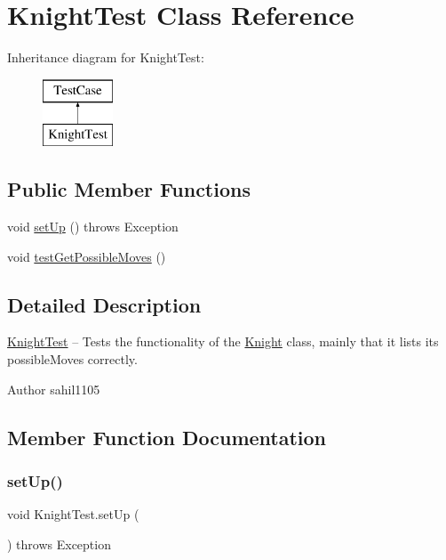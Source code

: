\hypertarget{class_knight_test}{}\section{Knight\+Test Class Reference}
\label{class_knight_test}
Inheritance diagram for Knight\+Test\+:\begin{figure}[H]
\begin{center}
\leavevmode
\includegraphics[height=2.000000cm]{class_knight_test}
\end{center}
\end{figure}
\subsection*{Public Member Functions}
\begin{DoxyCompactItemize}
\item 
void \mbox{\hyperlink{class_knight_test_a1fe60953fca935c0b6550c2a695cc242}{set\+Up}} ()  throws Exception 
\item 
void \mbox{\hyperlink{class_knight_test_a165adb4b4b39b57ea73dce413accecdf}{test\+Get\+Possible\+Moves}} ()
\end{DoxyCompactItemize}


\subsection{Detailed Description}
\mbox{\hyperlink{class_knight_test}{Knight\+Test}} -- Tests the functionality of the \mbox{\hyperlink{class_knight}{Knight}} class, mainly that it lists its possible\+Moves correctly. \begin{DoxyAuthor}{Author}
sahil1105 
\end{DoxyAuthor}


\subsection{Member Function Documentation}
\mbox{\label{class_knight_test_a1fe60953fca935c0b6550c2a695cc242}} 
\subsubsection{\texorpdfstring{set\+Up()}{setUp()}}
{\footnotesize\ttfamily void Knight\+Test.\+set\+Up (\begin{DoxyParamCaption}{ }\end{DoxyParamCaption}) throws Exception}

